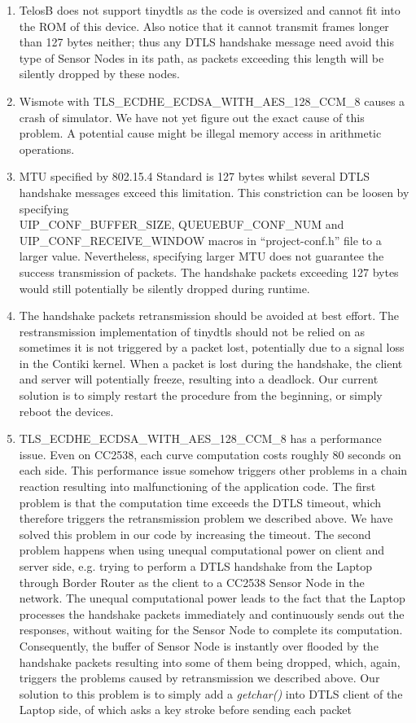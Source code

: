 \begin{enumerate}
	\item TelosB does not support tinydtls as the code is oversized and cannot fit into the ROM of this device. Also notice that it cannot transmit frames longer than 127 bytes neither; thus any DTLS handshake message need avoid this type of Sensor Nodes in its path, as packets exceeding this length will be silently dropped by these nodes.
	\item Wismote with TLS\_ECDHE\_ECDSA\_WITH\_AES\_128\_CCM\_8 causes a crash of simulator. We have not yet figure out the exact cause of this problem. A potential cause might be illegal memory access in arithmetic operations.
	\item MTU specified by 802.15.4 Standard is 127 bytes whilst several DTLS handshake messages exceed this limitation. This constriction can be loosen by specifying\\ UIP\_CONF\_BUFFER\_SIZE, QUEUEBUF\_CONF\_NUM and UIP\_CONF\_RECEIVE\_WINDOW macros in ``project-conf.h'' file to a larger value. Nevertheless, specifying larger MTU does not guarantee the success transmission of packets. The handshake packets exceeding 127 bytes would still potentially be silently dropped during runtime.
	\item The handshake packets retransmission should be avoided at best effort. The restransmission implementation of tinydtls should not be relied on as sometimes it is not triggered by a packet lost, potentially due to a signal loss in the Contiki kernel. When a packet is lost during the handshake, the client and server will potentially freeze, resulting into a deadlock. Our current solution is to simply restart the procedure from the beginning, or simply reboot the devices.
	\item TLS\_ECDHE\_ECDSA\_WITH\_AES\_128\_CCM\_8 has a performance issue. Even on CC2538, each curve computation costs roughly 80 seconds on each side. This performance issue somehow triggers other problems in a chain reaction resulting into malfunctioning of the application code. The first problem is that the computation time exceeds the DTLS timeout, which therefore triggers the retransmission problem we described above. We have solved this problem in our code by increasing the timeout. The second problem happens when using  unequal computational power on client and server side, e.g. trying to perform a DTLS handshake from the Laptop through Border Router as the client to a CC2538 Sensor Node in the network. The unequal computational power leads to the fact that the Laptop processes the handshake packets immediately and continuously sends out the responses, without waiting for the Sensor Node to complete its computation. Consequently, the buffer of Sensor Node is instantly over flooded by the handshake packets resulting into some of them being dropped, which, again, triggers the problems caused by retransmission we described above. Our solution to this problem is to simply add a \textit{getchar()} into DTLS client of the Laptop side, of which asks a key stroke before sending each packet

\end{enumerate}

